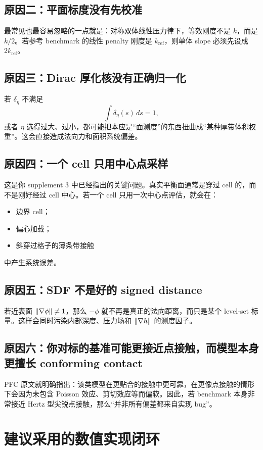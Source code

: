 \documentclass[12pt,a4paper]{ctexart}
\begin{document}
\subsection{原因二：平面标度没有先校准}
最常见也最容易忽略的一点就是：对称双体线性压力律下，等效刚度不是 $k$，而是 $k/2$。若参考 benchmark 的线性 penalty 刚度是 $k_{\mathrm{ref}}$，则单体 slope 必须先设成 $2k_{\mathrm{ref}}$。

\subsection{原因三：Dirac 厚化核没有正确归一化}
若 $\delta_\eta$ 不满足
\begin{equation}
    \int \delta_\eta(s)\,ds = 1,
\end{equation}
或者 $\eta$ 选得过大、过小，都可能把本应是“面测度”的东西扭曲成“某种厚带体积权重”。这会直接造成法向力和面积系统偏差。

\subsection{原因四：一个 cell 只用中心点采样}
这是你 supplement 3 中已经指出的关键问题。真实平衡面通常是穿过 cell 的，而不是刚好经过 cell 中心。若一个 cell 只用一次中心点评估，就会在：
\begin{itemize}
    \item 边界 cell；
    \item 偏心加载；
    \item 斜穿过格子的薄条带接触
\end{itemize}
中产生系统误差。

\subsection{原因五：SDF 不是好的 signed distance}
若近表面 $\norm{\nabla \phi}\neq 1$，那么 $-\phi$ 就不再是真正的法向距离，而只是某个 level-set 标量。这样会同时污染内部深度、压力场和 $\norm{\nabla h}$ 的测度因子。

\subsection{原因六：你对标的基准可能更接近点接触，而模型本身更擅长 conforming contact}
PFC 原文就明确指出：该类模型在更贴合的接触中更可靠，在更像点接触的情形下会因为未包含 Poisson 效应、剪切效应等而偏软。因此，若 benchmark 本身非常接近 Hertz 型尖锐点接触，那么“并非所有偏差都来自实现 bug”。

\section{建议采用的数值实现闭环}
\end{document}
